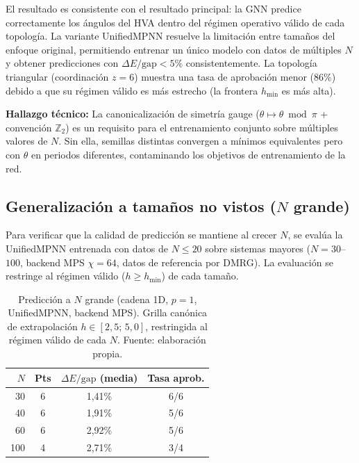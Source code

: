 \documentclass[11pt,a4paper,spanish]{book}
\begin{document}
El resultado es consistente con el resultado principal: la GNN predice correctamente los ángulos del HVA dentro del régimen operativo válido de cada topología. La variante UnifiedMPNN resuelve la limitación entre tamaños del enfoque original, permitiendo entrenar un único modelo con datos de múltiples $N$ y obtener predicciones con $\Delta E/\text{gap} < 5\%$ consistentemente. La topología triangular (coordinación $z = 6$) muestra una tasa de aprobación menor (86\%) debido a que su régimen válido es más estrecho (la frontera $h_{\min}$ es más alta).

\textbf{Hallazgo técnico:} La canonicalización de simetría gauge ($\theta \mapsto \theta \bmod \pi$ + convención $\mathbb{Z}_2$) es un requisito para el entrenamiento conjunto sobre múltiples valores de $N$. Sin ella, semillas distintas convergen a mínimos equivalentes pero con $\theta$ en periodos diferentes, contaminando los objetivos de entrenamiento de la red.

\subsection{Generalización a tamaños no vistos ($N$ grande)}
\label{subsec:large_n_extrap}

Para verificar que la calidad de predicción se mantiene al crecer $N$, se evalúa la UnifiedMPNN entrenada con datos de $N \leq 20$ sobre sistemas mayores ($N = 30$--$100$, backend MPS $\chi = 64$, datos de referencia por DMRG). La evaluación se restringe al régimen válido ($h \geq h_{\min}$) de cada tamaño.

\begin{table}[h]
\centering
\caption[Predicción a $N$ grande (cadena 1D, $p = 1$)]{Predicción a $N$ grande (cadena 1D, $p = 1$, UnifiedMPNN, backend MPS). Grilla canónica de extrapolación $h \in [2{,}5;\, 5{,}0]$, restringida al régimen válido de cada $N$. Fuente: elaboración propia.}
\label{tab:large_n_chain}
\begin{tabular}{rccc}
\toprule
\textbf{$N$} & \textbf{Pts} & \textbf{$\Delta E/\text{gap}$ (media)} & \textbf{Tasa aprob.} \\
\midrule
30 & 6 & 1,41\% & 6/6 \\
40 & 6 & 1,91\% & 5/6 \\
60 & 6 & 2,92\% & 5/6 \\
100 & 4 & 2,71\% & 3/4 \\
\bottomrule
\end{tabular}
\end{table}
\end{document}
